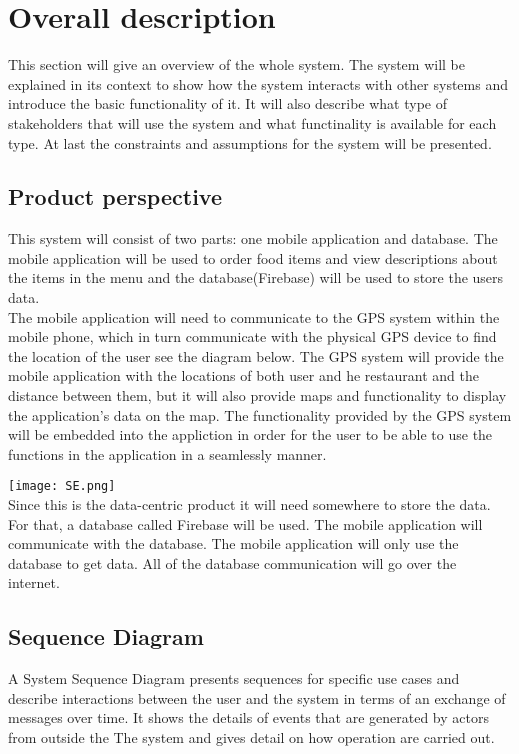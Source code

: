 \documentclass[12pt]{article}
\begin{document}
\section{Overall description}
This section will give an overview of the whole system. The system will be explained in its context to show how the system interacts with other systems and introduce the basic functionality of it. It will also describe what type of stakeholders that will use the system and what functinality is available for each type. At last the constraints and assumptions for the system will be presented.
\subsection{Product perspective}
This system will consist of two parts: one mobile application and database. The mobile application will be used to order food items and view descriptions about the items in the menu and the database(Firebase) will be used to store the users data.
\\
The mobile application will need to communicate to the GPS system within the mobile phone, which in turn communicate with the physical GPS device to find the location of the user see the diagram below. The GPS system will provide the mobile application with the locations of both user and he restaurant and the distance between them, but it will also provide maps and functionality to display the application's data on the map. The functionality provided by the GPS system will be embedded into the appliction in order for the user to be able to use the functions in the application in a seamlessly manner.

\texttt{[image: SE.png]}
\\
Since this is the data-centric product it will need somewhere to store the data. For that, a database called Firebase will be used. The mobile application will communicate with the database. The mobile application will only use the database to get data. All of the database communication will go over the internet.

\subsection{Sequence Diagram}
A System Sequence Diagram presents sequences for specific use cases and describe interactions between the user and the system in terms of an exchange of messages over time. It shows the details of events that are generated by actors from outside the  The system and gives detail on how operation are carried out. 
\end{document}
